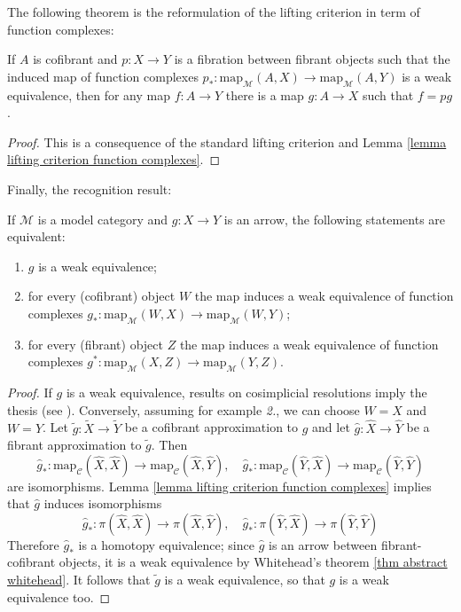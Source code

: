 \begin{refsection}
The following theorem is the reformulation of the lifting criterion in term of function complexes:

\begin{thm} \label{thm lifting criterion function complexes}
If $A$ is cofibrant and $p \colon X \to Y$ is a fibration between fibrant objects such that the induced map of function complexes $p_* \colon \mathrm{map}_{\mathcal M}(A,X) \to \mathrm{map}_{\mathcal M}(A,Y)$ is a weak equivalence, then for any map $f \colon A \to Y$ there is a map $g \colon A \to X$ such that $f = pg$.
\end{thm}

\begin{proof}
This is a consequence of the standard lifting criterion and Lemma \ref{lemma lifting criterion function complexes}.
\end{proof}

Finally, the recognition result:

\begin{thm} \label{thm recognition via function complexes}
If $\mathcal M$ is a model category and $g \colon X \to Y$ is an arrow, the following statements are equivalent:
\begin{enumerate}
\item $g$ is a weak equivalence;
\item for every (cofibrant) object $W$ the map induces a weak equivalence of function complexes $g_* \colon \mathrm{map}_{\mathcal M}(W,X) \to \mathrm{map}_{\mathcal M}(W,Y)$;
\item for every (fibrant) object $Z$ the map induces a weak equivalence of function complexes $g^* \colon \mathrm{map}_{\mathcal M}(X,Z) \to \mathrm{map}_{\mathcal M}(Y,Z)$.
\end{enumerate}
\end{thm}

\begin{proof}
If $g$ is a weak equivalence, results on cosimplicial resolutions imply the thesis (see \cite[Theorem 17.6.3]{hirschhorn}). Conversely, assuming for example \emph{2.}, we can choose $W = X$ and $W = Y$. Let $\widetilde{g} \colon \widetilde{X} \to \widetilde{Y}$ be a cofibrant approximation to $g$ and let $\widehat{g} \colon \widehat{X} \to \widehat{Y}$ be a fibrant approximation to $\widetilde{g}$. Then
\[
\widehat{g}_* \colon \mathrm{map}_{\mathcal C}(\widehat{X},\widehat{X}) \to \mathrm{map}_{\mathcal C}(\widehat{X}, \widehat{Y}), \quad \widehat{g}_* \colon \mathrm{map}_{\mathcal C}(\widehat{Y},\widehat{X}) \to \mathrm{map}_{\mathcal C}(\widehat{Y},\widehat{Y})
\]
are isomorphisms. Lemma \ref{lemma lifting criterion function complexes} implies that $\widehat{g}$ induces isomorphisms
\[
\widehat{g}_* \colon \pi(\widehat{X},\widehat{X}) \to \pi(\widehat{X},\widehat{Y}), \quad \widehat{g}_* \colon \pi(\widehat{Y},\widehat{X}) \to \pi(\widehat{Y},\widehat{Y})
\]
Therefore $\widehat{g}_*$ is a homotopy equivalence; since $\widehat{g}$ is an arrow between fibrant-cofibrant objects, it is a weak equivalence by Whitehead's theorem \ref{thm abstract whitehead}. It follows that $\widetilde{g}$ is a weak equivalence, so that $g$ is a weak equivalence too.
\end{proof}


\end{refsection}
